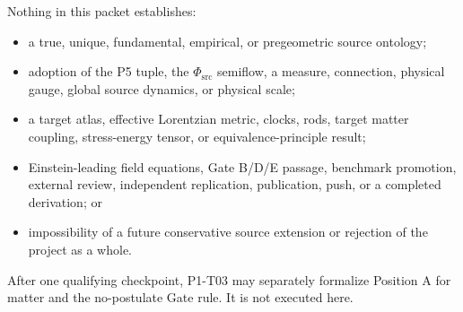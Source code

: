 \documentclass[11pt]{article}
\newcommand{\PhiSrc}{\Phi_{\mathrm{src}}}
\begin{document}
Nothing in this packet establishes:
\begin{itemize}
  \item a true, unique, fundamental, empirical, or pregeometric source
  ontology;
  \item adoption of the P5 tuple, the \(\PhiSrc\) semiflow, a measure,
  connection, physical gauge, global source dynamics, or physical scale;
  \item a target atlas, effective Lorentzian metric, clocks, rods, target
  matter coupling, stress-energy tensor, or equivalence-principle result;
  \item Einstein-leading field equations, Gate B/D/E passage, benchmark
  promotion, external review, independent replication, publication, push, or
  a completed derivation; or
  \item impossibility of a future conservative source extension or rejection
  of the project as a whole.
\end{itemize}

After one qualifying checkpoint, P1-T03 may separately formalize Position A
for matter and the no-postulate Gate rule. It is not executed here.
\end{document}
